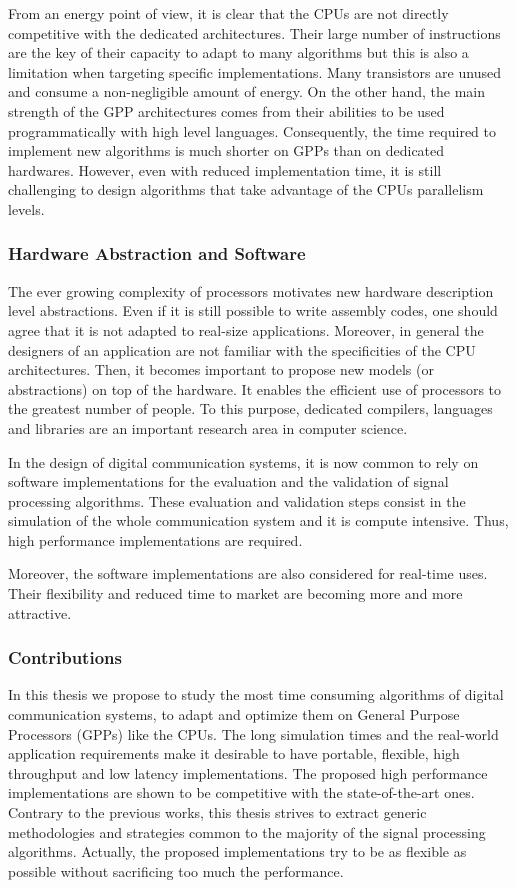 From an energy point of view, it is clear that the CPUs are not directly
competitive with the dedicated architectures. Their large number of instructions
are the key of their capacity to adapt to many algorithms but this is also a
limitation when targeting specific implementations. Many transistors are
unused and consume a non-negligible amount of energy. On the other hand, the
main strength of the GPP architectures comes from their abilities to be used
programmatically with high level languages. Consequently, the time required to
implement new algorithms is much shorter on GPPs than on dedicated hardwares.
However, even with reduced implementation time, it is still challenging to
design algorithms that take advantage of the CPUs parallelism levels.

\subsubsection*{Hardware Abstraction and Software}

The ever growing complexity of processors motivates new hardware description
level abstractions. Even if it is still possible to write assembly codes, one
should agree that it is not adapted to real-size applications. Moreover, in
general the designers of an application are not familiar with the specificities
of the CPU architectures. Then, it becomes important to propose new models (or
abstractions) on top of the hardware. It enables the efficient use of processors
to the greatest number of people. To this purpose, dedicated compilers,
languages and libraries are an important research area in computer science.

In the design of digital communication systems, it is now common to rely on
software implementations for the evaluation and the validation of signal
processing algorithms. These evaluation and validation steps consist in
the simulation of the whole communication system and it is compute intensive.
Thus, high performance implementations are required.

Moreover, the software implementations are also considered for real-time uses.
Their flexibility and reduced time to market are becoming more and more
attractive.

\subsubsection*{Contributions}

In this thesis we propose to study the most time consuming algorithms of digital
communication systems, to adapt and optimize them on General Purpose Processors
(GPPs) like the CPUs. The long simulation times and the real-world application
requirements make it desirable to have portable, flexible, high throughput and
low latency implementations. The proposed high performance implementations are
shown to be competitive with the state-of-the-art ones. Contrary to the previous
works, this thesis strives to extract generic methodologies and strategies
common to the majority of the signal processing algorithms. Actually, the
proposed implementations try to be as flexible as possible without sacrificing
too much the performance.

